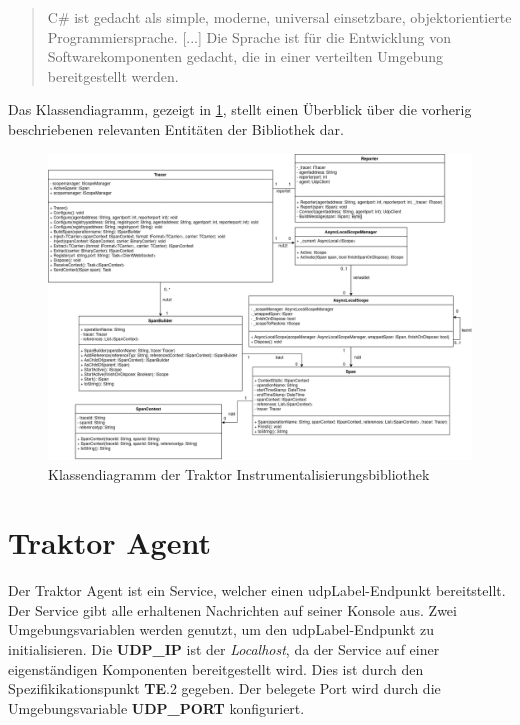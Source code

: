\begin{quote}
	\cbstart
	C\# ist gedacht als simple, moderne,  universal einsetzbare, objektorientierte Programmiersprache. [...] Die Sprache ist für die Entwicklung von Softwarekomponenten gedacht, die in einer verteilten Umgebung bereitgestellt werden.
	\cbend
\end{quote}

Das Klassendiagramm, gezeigt in \cref{fig:TraktorKlassendiagramm}, stellt einen Überblick über die vorherig beschriebenen relevanten Entitäten der Bibliothek dar.

\newpage
\begin{landscape}
	\begin{figure}
		\centering
		\includegraphics[scale=0.4]{img/Implementierung/TraktorKlassendiagramm.png}
		\caption[Klassendiagramm der Traktor Instrumentalisierungsbibliothek]{Klassendiagramm der Traktor Instrumentalisierungsbibliothek}
		\label{fig:TraktorKlassendiagramm}
	\end{figure}
\end{landscape}

\section{Traktor Agent}
\label{section:Traktor Agent}

Der Traktor Agent ist ein Service, welcher einen \gls{udpLabel}-Endpunkt bereitstellt. Der Service gibt alle erhaltenen Nachrichten auf seiner Konsole aus. Zwei Umgebungsvariablen werden genutzt, um den \gls{udpLabel}-Endpunkt zu initialisieren. Die \textbf{UDP\_IP} ist der \emph{Localhost}, da der Service auf einer eigenständigen Komponenten bereitgestellt wird. Dies ist durch den Spezifikikationspunkt \textbf{TE}.2  gegeben. Der belegete Port wird durch die Umgebungsvariable \textbf{UDP\_PORT} konfiguriert. 

